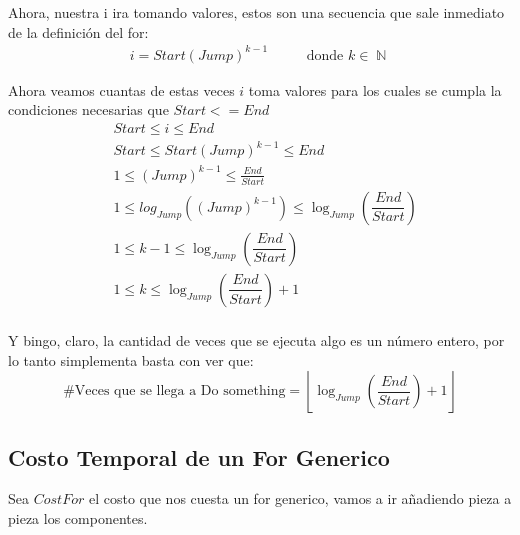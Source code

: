 \documentclass[12pt, fleqn]{article}                            %
\DeclareMathOperator \MegaSpace {\quad \quad}                   %
\theoremstyle{break}                                            %
\DeclareMathOperator \Naturals     {\mathbb{N}}                 %
\newcommand{\Wrap}[1]    {\left( #1 \right)}                    %
\newcommand{\Floor}[1]{\left \lfloor #1 \right \rfloor}         %
\newcommand{\pfrac}[2]{\Wrap{\dfrac{#1}{#2}}}                   %
\begin{document}
            Ahora, nuestra i ira tomando valores, estos son una secuencia que 
            sale inmediato de la definición del for:
            \begin{align*}
                i = Start(Jump)^{k - 1} \MegaSpace \text{donde } k \in \Naturals 
            \end{align*}

            Ahora veamos cuantas de estas veces $i$ toma valores para los
            cuales se cumpla la condiciones necesarias que $Start <= End$
            \begin{align*}
                &Start \leq i \leq End                                                  \\
                &Start \leq Start(Jump)^{k - 1} \leq End                                \\
                &1 \leq (Jump)^{k - 1} \leq \frac{End}{Start}                           \\
                &1 \leq log_{Jump}\Wrap{(Jump)^{k - 1}} \leq \log_{Jump}\pfrac{End}{Start}  \\
                &1 \leq k - 1 \leq \log_{Jump}\pfrac{End}{Start}                        \\
                &1 \leq k \leq \log_{Jump}\pfrac{End}{Start} + 1                        \\
            \end{align*}

            Y bingo, claro, la cantidad de veces que se ejecuta algo es un número
            entero, por lo tanto simplementa basta con ver que:
            \begin{equation*}
                \text{\# Veces que se llega a Do something} = \Floor{\log_{Jump}\pfrac{End}{Start} + 1}
            \end{equation*}



    \clearpage
    \subsection{Costo Temporal de un For Generico}

        Sea $CostFor$ el costo que nos cuesta un for generico, vamos a ir añadiendo
        pieza a pieza los componentes.
\end{document}
